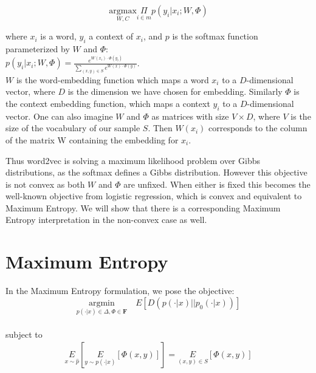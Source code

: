 \documentclass[]{article}
\begin{document}
\begin{equation} \underset{W,C}{\text{argmax}} \underset{i \in m}{\Pi}{p(y_i|x_i; W, \Phi)}\label{eq:gibbs}\end{equation} 

\noindent where $x_i$ is a word, $y_i$ a context of $x_i$, and $p$ is the softmax function parameterized by $W$ and $\Phi$:\\

$p(y_i|x_i; W,\Phi) = \frac{e^{W(x_i) \cdot \Phi(y_i)}}{\sum_{(x,y) \in S}e^{W(x) \cdot \Phi(y)}}$.\\

$W$ is the word-embedding function which maps a word $x_i$ to a $D$-dimensional vector, where $D$ is the dimension we have chosen for embedding. Similarly $\Phi$ is the context embedding function, which maps a context $y_i$ to a $D$-dimensional vector. One can also imagine $W$ and $\Phi$ as matrices with size $V \times D$, where $V$ is the size of the vocabulary of our sample $S$. Then $W(x_i)$ corresponds to the column of the matrix W containing the embedding for $x_i$.

Thus word2vec is solving a maximum likelihood problem over Gibbs distributions, as the softmax defines a Gibbs distribution. However this objective is not convex as both $W$ and $\Phi$ are unfixed. When either is fixed this becomes the well-known objective from logistic regression, which is convex and equivalent to Maximum Entropy\cite{dummy}. We will show that there is a corresponding Maximum Entropy interpretation in the non-convex case as well. 

\section{Maximum Entropy}

In the Maximum Entropy formulation, we pose the objective:\\

\begin{equation}\underset{p(\cdot | x) \in \Delta, \Phi \in \mathbf{F}}{\text{argmin}} \quad E \left[D(p(\cdot|x) \vert \vert  p_0(\cdot|x))\right]\label{eq:maxent}
\end{equation}
\\

\noindent subject to\\

\begin{align}\underset{x \sim \hat{p}}{E}\left[\underset{y \sim p(\cdot|x)}{E}\left[\Phi(x,y)\right]\right] = \underset{(x,y) \in S}{E}\left[\Phi(x,y)\right]
\end{align}
\end{document}

